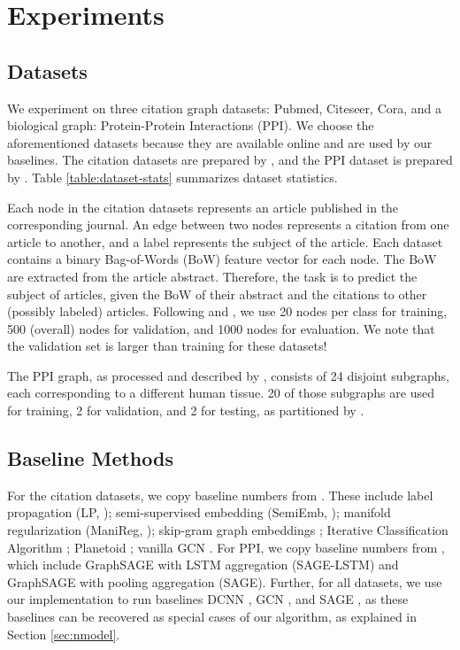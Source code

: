 
\section{Experiments}
\label{sec:experiments}


\subsection{Datasets}
We experiment on three citation graph datasets: Pubmed, Citeseer, Cora, and a biological graph: Protein-Protein Interactions (PPI).
We choose the aforementioned datasets because they are available online and are used by our baselines. The citation datasets are prepared by \cite{planetoid}, and the PPI dataset is prepared by \cite{sage}. Table \ref{table:dataset-stats} summarizes dataset statistics.



Each node in the citation datasets represents an article published in the corresponding journal. An edge between two nodes represents a citation from one article to another, and a label represents the subject of the article. Each dataset contains a binary Bag-of-Words (BoW) feature vector for each node. The BoW are extracted from the article abstract. Therefore, the task is to predict the subject of articles, given the BoW of their abstract and the citations to other (possibly labeled) articles. Following \cite{planetoid} and \cite{kipf}, we use 20 nodes per class for training, 500 (overall) nodes for validation, and 1000 nodes for evaluation. We note that the validation set is larger than training  for these datasets!

The PPI graph, as processed and described by \cite{sage}, consists of 24 disjoint subgraphs, each corresponding to a different human tissue. 20 of those subgraphs are used for training, 2 for validation, and 2 for testing, as partitioned by \cite{sage}.

\subsection{Baseline Methods}

For the citation datasets, we copy baseline numbers from \cite{kipf}. These include label propagation (LP, \cite{lp}); semi-supervised embedding (SemiEmb, \cite{semiemb}); manifold regularization (ManiReg, \cite{manireg}); skip-gram graph embeddings \citep[DeepWalk][]{deepwalk}; Iterative Classification Algorithm \citep[ICA, ][]{ica}; Planetoid \citep{planetoid}; vanilla GCN \citep{kipf}. For PPI, we copy baseline numbers from \citep{sage}, which include GraphSAGE with LSTM aggregation (SAGE-LSTM) and GraphSAGE with pooling aggregation (SAGE). Further, for all datasets, we use our implementation to run baselines DCNN \citep{diffusion-cnn}, GCN \citep{kipf}, and SAGE \citep[with pooling aggregation, ][]{sage}, as these baselines can be recovered as special cases of our algorithm, as explained in Section \ref{sec:nmodel}.

